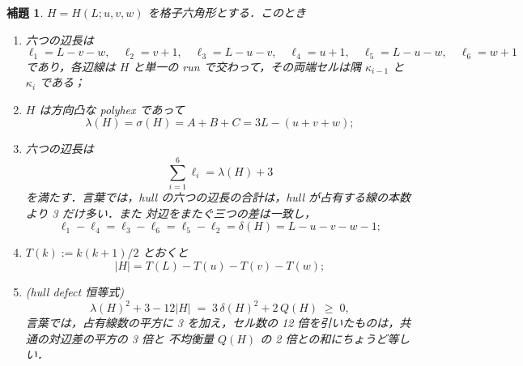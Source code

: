 \documentclass[11pt]{article}
\theoremstyle{plain}
\newtheorem{lemma}[theorem]{補題}
\theoremstyle{definition}
\theoremstyle{remark}
\begin{document}
\begin{lemma}\label{lem:hex}
\(H=H(L;u,v,w)\) を格子六角形とする．このとき
\begin{enumerate}
\item[(i)] 六つの辺長は
\[
   \ell_{1}=L-v-w,\quad \ell_{2}=v+1,\quad \ell_{3}=L-u-v,\quad
   \ell_{4}=u+1,\quad \ell_{5}=L-u-w,\quad \ell_{6}=w+1
\]
であり，各辺線は \(H\) と単一の run で交わって，その両端セルは隅 \(\kappa_{i-1}\) と
\(\kappa_{i}\) である；
\item[(ii)] \(H\) は方向凸な polyhex であって
\[
   \lambda(H)=\sigma(H)=A+B+C=3L-(u+v+w);
\]
\item[(iii)] 六つの辺長は
\begin{equation}\label{eq:sidesum}
   \sum_{i=1}^{6}\ell_{i}=\lambda(H)+3
\end{equation}
を満たす．言葉では，hull の六つの辺長の合計は，hull が占有する線の本数より 3 だけ多い．また
対辺をまたぐ三つの差は一致し，
\begin{equation}\label{eq:delta}
   \ell_{1}-\ell_{4}=\ell_{3}-\ell_{6}=\ell_{5}-\ell_{2}=\delta(H)=L-u-v-w-1 ;
\end{equation}
\item[(iv)] \(T(k):=k(k+1)/2\) とおくと
\[
   |H|=T(L)-T(u)-T(v)-T(w) ;
\]
\item[(v)] \textup{(hull defect 恒等式)}
\begin{equation}\label{eq:defectid}
   \lambda(H)^{2}+3-12|H| \;=\; 3\,\delta(H)^{2}+2\,Q(H)\;\ge\;0 ,
\end{equation}
言葉では，占有線数の平方に 3 を加え，セル数の 12 倍を引いたものは，共通の対辺差の平方の 3 倍と
不均衡量 \(Q(H)\) の 2 倍との和にちょうど等しい．
\end{enumerate}
\end{lemma}
\end{document}
